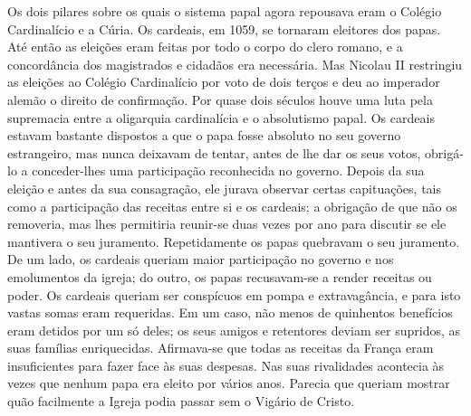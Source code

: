 \documentclass[11pt,a5paper,twoside,openany]{book}
\begin{document}
Os dois pilares sobre os quais o sistema papal agora repousava eram o Colégio Cardinalício e a Cúria. Os cardeais, em 1059, se tornaram eleitores dos papas. Até então as eleições eram feitas por todo o corpo do clero romano, e a concordância dos magistrados e cidadãos era necessária. Mas Nicolau II restringiu as eleições ao Colégio Cardinalício por voto de dois terços e deu ao imperador alemão o direito de confirmação. Por quase dois séculos houve uma luta pela supremacia entre a oligarquia cardinalícia e o absolutismo papal. Os cardeais estavam bastante dispostos a que o papa fosse absoluto no seu governo estrangeiro, mas nunca deixavam de tentar, antes de lhe dar os seus votos, obrigá-lo a conceder-lhes uma participação reconhecida no governo. Depois da sua eleição e antes da sua consagração, ele jurava observar certas capituações, tais como a participação das receitas entre si e os cardeais; a obrigação de que não os removeria, mas lhes permitiria reunir-se duas vezes por ano para discutir se ele mantivera o seu juramento. Repetidamente os papas quebravam o seu juramento. De um lado, os cardeais queriam maior participação no governo e nos emolumentos da igreja; do outro, os papas recusavam-se a render receitas ou poder. Os cardeais queriam ser conspícuos em pompa e extravagância, e para isto vastas somas eram requeridas. Em um caso, não menos de quinhentos benefícios eram detidos por um só deles; os seus amigos e retentores deviam ser supridos, as suas famílias enriquecidas. Afirmava-se que todas as receitas da França eram insuficientes para fazer face às suas despesas. Nas suas rivalidades acontecia às vezes que nenhum papa era eleito por vários anos. Parecia que queriam mostrar quão facilmente a Igreja podia passar sem o Vigário de Cristo.
\end{document}
